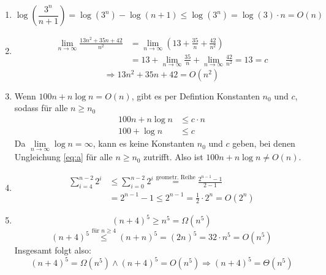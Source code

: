\documentclass[11pt,a4paper]{article}
\begin{document}
\begin{loesung}
\begin{enumerate}
    \item
    \begin{equation}
        \log\left(\frac{3^n}{n + 1}\right) = \log(3^n) - \log(n + 1)
        \leq \log(3^n) = \log(3) \cdot n = O(n)
    \end{equation}

    \item 
    \begin{align}
        \lim\limits_{n \rightarrow \infty} \frac{13n^2 + 35n + 42}{n^2} &= \lim\limits_{n \rightarrow \infty} \left(13 + \frac{35}{n} + \frac{42}{n^2}\right) \\
        &= 13 + \lim\limits_{n \rightarrow \infty} \frac{35}{n} + \lim\limits_{n \rightarrow \infty} \frac{42}{n^2} = 13 = c
    \end{align}
    \begin{equation}
        \Rightarrow 13n^2 + 35n + 42 = O(n^2)
    \end{equation}

    \item
    Wenn $100n + n \log n = O(n)$, gibt es per Defintion Konstanten $n_0$ und $c$, sodass für alle $n \geq n_0$
    \begin{align}
        100n + n \log n &\leq c\cdot n  \\
        \label{eq:a}
        100 + \log n &\leq c
    \end{align}
    Da $\lim\limits_{n \rightarrow \infty} \log n = \infty$, kann es keine Konstanten $n_0$ und $c$ geben, bei denen Ungleichung \ref{eq:a} für alle $n \geq n_0$ zutrifft.
    Also ist $100n + n \log n \neq O(n)$.
    
    \item
    \begin{align}
        \sum\limits_{i=4}^{n-2} 2^i &\leq \sum\limits_{i=0}^{n-2} 2^i
        \overset{\text{geometr. Reihe}}{=} \frac{2^{n-1} - 1}{2 - 1} \\
        &= 2^{n-1} - 1 \leq 2^{n-1} = \frac{1}{2} \cdot 2^n = O(2^n)
    \end{align}

    \item
    \begin{equation}
        (n+4)^5 \geq n^5 = \Omega(n^5)
    \end{equation}
    \begin{equation}
        (n+4)^5 \overset{\text{für }n \geq 4}{\leq} (n + n)^5 = (2n)^5 = 32 \cdot n ^5 = O(n^5)
    \end{equation}
    Insgesamt folgt also:
    \begin{equation}
        (n+4)^5 = \Omega(n^5) \wedge (n+4)^5 = O(n^5) \Rightarrow (n+4)^5 = \Theta(n^5)
    \end{equation}


\end{enumerate}
\end{loesung}
\end{document}
